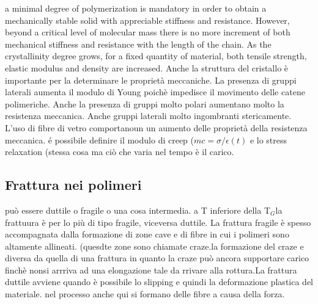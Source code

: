 a minimal degree of polymerization is mandatory in order to obtain a mechanically 
stable solid with appreciable stiffness and resistance. However, beyond a critical level 
of molecular mass there is no more increment of both mechanical stiffness and 
resistance with the length of the chain.
 As the crystallinity degree grows, for a fixed quantity of material, both tensile strength, 
elastic modulus and density are increased. Anche la struttura del cristallo è importante per la determinare le proprietà meccaniche. La presenza di gruppi laterali aumenta il modulo di Young poichè impedisce il movimento delle catene polimeriche. Anche la presenza di gruppi molto polari aumentano molto la resistenza meccanica. Anche gruppi laterali molto ingombranti stericamente. L'uso di fibre di vetro comportanoun un aumento delle proprietà della resistenza meccanica. é possibile definire il modulo di creep ($mc=\sigma/\epsilon(t)$ e lo stress relaxation (stessa cosa ma ciò che varia nel tempo è il carico.
\subsection{Frattura nei polimeri}
può essere duttile o fragile o una cosa intermedia. a T inferiore della T$_G$la frattuura è per lo più di tipo fragile, viceversa duttile. La frattura fragile è spesso accompagnata dalla formazione di zone cave e di fibre in cui i polimeri sono altamente allineati. (quesdte zone sono chiamate craze.la formazione del craze e diversa da quella di una frattura in quanto la craze può ancora supportare carico finchè nonsi arrriva ad una elongazione tale da rrivare alla rottura.La frattura duttile avviene quando è possibile lo slipping e quindi la deformazione plastica del materiale. nel processo anche qui si formano delle fibre a causa della forza.

